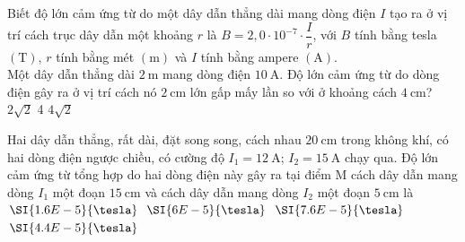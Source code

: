 \begin{ex}
	Biết độ lớn cảm ứng từ do một dây dẫn thẳng dài mang dòng điện $I$ tạo ra ở vị trí cách trục dây dẫn một khoảng $r$ là $B=2,0 \cdot 10^{-7}\cdot \dfrac{I}{r}$, với $B$ tính bằng tesla $\left(\si{\tesla}\right)$, $r$ tính bằng mét $\left(\si{\meter}\right)$ và $I$ tính bằng ampere $\left(\si{\ampere}\right)$.\\
	Một dây dẫn thẳng dài $\SI{2}{\meter}$ mang dòng điện $\SI{10}{\ampere}$. Độ lớn cảm ứng từ do dòng điện gây ra ở vị trí cách nó $\SI{2}{\centi\meter}$ lớn gấp mấy lần so với ở khoảng cách $\SI{4}{\centi\meter}$?
	\choice
	{}
	{$2 \sqrt{2}$}
	{4}
	{$4 \sqrt{2}$}
\end{ex}
\begin{ex}
	Hai dây dẫn thẳng, rất dài, đặt song song, cách nhau $\SI{20}{\centi\meter}$ trong không khí, có hai dòng điện ngược chiều, có cường độ $I_1 =\SI{12}{\ampere}$; $I_2 =\SI{15}{\ampere}$ chạy qua. Độ lớn cảm ứng từ tổng hợp do hai dòng điện này gây ra tại điểm M cách dây dẫn mang dòng $I_1$ một đoạn $\SI{15}{\centi\meter}$ và cách dây dẫn mang dòng $I_2$ một đoạn $\SI{5}{\centi\meter}$ là
	\choice
	{$\SI{1.6E-5}{\tesla}$}
	{$\SI{6E-5}{\tesla}$}
	{\True $\SI{7.6E-5}{\tesla}$}
	{$\SI{4.4E-5}{\tesla}$}
\end{ex}
